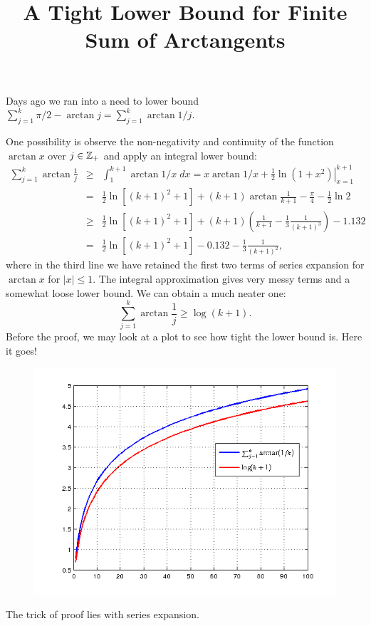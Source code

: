 \documentclass[12pt]{article}
\title{A Tight Lower Bound for Finite Sum of Arctangents}
\begin{document}
\iftex \maketitle \fi 

Days ago we ran into a need to lower bound $\sum_{j=1}^k \pi/2 - \arctan j = \sum_{j=1}^k \arctan 1/j$. 

One possibility is observe the non-negativity and continuity of the function $\arctan x$ over $j \in {\mathbb Z}_+$ and apply an integral lower bound: 
\begin{eqnarray*}
\sum_{j=1}^k \arctan \frac{1}{j} 
&\geq & \int_{1}^{k+1} \arctan 1/x \; dx 
 = \left. x\arctan 1/x + \frac{1}{2} \ln \left(1+x^2\right) \right|_{x = 1}^{k+1} \\
& = &  \frac{1}{2}\ln \left[\left(k+1\right)^2 +1\right] + \left(k+1\right) \arctan \frac{1}{k+1} - \frac{\pi}{4} - \frac{1}{2} \ln 2 \\
& \geq & \frac{1}{2}\ln \left[\left(k+1\right)^2 +1\right] + \left(k+1\right) \left(\frac{1}{k+1} - \frac{1}{3} \frac{1}{\left(k+1\right)^3}\right) - 1.132 \\
& = &  \frac{1}{2}\ln \left[\left(k+1\right)^2 +1\right] - 0.132 - \frac{1}{3} \frac{1}{\left(k+1\right)^2}, 
\end{eqnarray*}
where in the third line we have retained the first two terms of series expansion for $\arctan x$ for $|x|\leq 1$. The integral approximation gives very messy terms and a somewhat loose lower bound. We can obtain a much neater one:
\begin{equation}
\sum_{j=1}^k \arctan \frac{1}{j} \geq \log \left(k+1\right). 
\end{equation}
Before the proof, we may look at a plot to see how tight the lower bound is. Here it goes!
\iftex
\begin{figure}
\centering
\includegraphics[width = 0.7\linewidth]{03_06_2012a.png}
\end{figure}
\fi 
The trick of proof lies with series expansion. \\
\end{document}
